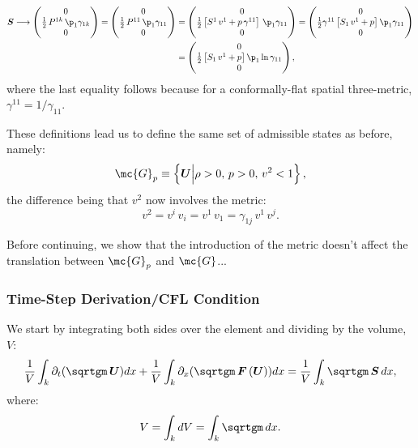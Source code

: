 \documentclass[10pt,preprint]{aastex}
\begin{document}
\begin{align*}
    \vect{S}\longrightarrow\begin{pmatrix}0\\\f{1}{2}\,P^{1k}\,\p_{1}\gamma_{1k}\\0\end{pmatrix}=\begin{pmatrix}0\\\f{1}{2}\,P^{11}\,\p_{1}\gamma_{11}\\0\end{pmatrix}&=\begin{pmatrix}0\\\f{1}{2}\left[S^{1}\,v^{1}+p\,\gamma^{11}\right]\,\p_{1}\gamma_{11}\\0\end{pmatrix}=\begin{pmatrix}0\\\f{1}{2}\gamma^{11}\left[S_{1}\,v^{1}+p\right]\p_{1}\gamma_{11}\\0\end{pmatrix}\\
    &=\begin{pmatrix}0\\\f{1}{2}\left[S_{1}\,v^{1}+p\right]\p_{1}\ln\gamma_{11}\\0\end{pmatrix},
\end{align*}
where the last equality follows because for a conformally-flat spatial three-metric, $\gamma^{11}=1/\gamma_{11}$.

These definitions lead us to define the same set of admissible states as before, namely:
\begin{equation*}
    \mc{G}_{p}\equiv\left\{\vect{U}\Big|\rho>0,\,p>0,\,v^{2}<1\right\},
\end{equation*}
the difference being that $v^{2}$ now involves the metric:
\begin{equation*}
    v^{2}=v^{i}\,v_{i}=v^{1}\,v_{1}=\gamma_{1j}\,v^{1}\,v^{j}.
\end{equation*}

Before continuing, we show that the introduction of the metric doesn't affect the translation between $\mc{G}_{p}$ and $\mc{G}$...

\subsubsection{Time-Step Derivation/CFL Condition}
We start by integrating both sides over the element and dividing by the volume, $V$:
\begin{equation*}
    \f{1}{V}\int_{k}\pd{\left(\sqrtgm\,\vect{U}\right)}{t}dx+\f{1}{V}\int_{k}\pd{\left(\sqrtgm\,\vect{F}\left(\vect{U}\right)\right)}{x}dx=\f{1}{V}\int_{k}\sqrtgm\,\vect{S}\,dx,
\end{equation*}
where:
\begin{equation*}
    V=\int_{k}dV=\int_{k}\sqrtgm\,dx.
\end{equation*}
\end{document}
